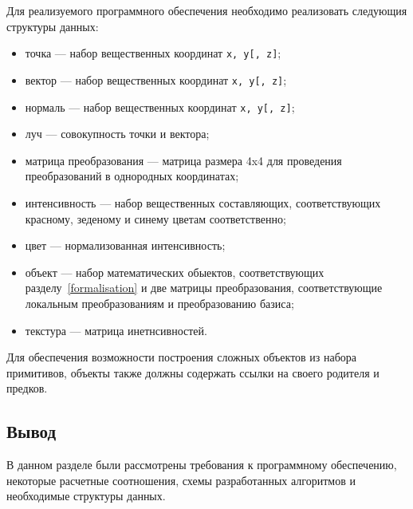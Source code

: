 Для реализуемого программного обеспечения необходимо реализовать следующия
структуры данных:
\begin{itemize}
    \item точка --- набор вещественных координат \verb|x, y[, z]|;
    \item вектор --- набор вещественных координат \verb|x, y[, z]|;
    \item нормаль --- набор вещественных координат \verb|x, y[, z]|;
    \item луч --- совокупность точки и вектора;
    \item матрица преобразования --- матрица размера 4x4 для проведения
          преобразований в однородных координатах;
    \item интенсивность --- набор вещественных составляющих, соответствующих
          красному, зеденому и синему цветам соответственно;
    \item цвет --- нормализованная интенсивность;
    \item объект --- набор математических обыектов, соответствующих
          разделу~\ref{formalisation} и две матрицы преобразования,
          соответствующие локальным преобразованиям и преобразованию
          базиса;
    \item текстура --- матрица инетнсивностей.
\end{itemize}
Для обеспечения возможности построения сложных объектов из набора примитивов,
объекты также должны содержать ссылки на своего родителя и предков.

\subsection*{Вывод}
В данном разделе были рассмотрены требования к программному обеспечению,
некоторые расчетные соотношения, схемы разработанных алгоритмов и необходимые
структуры данных.

\pagebreak

